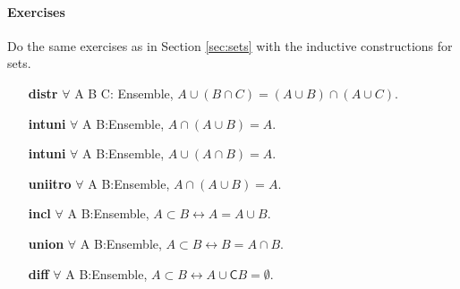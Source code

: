 \paragraph{\bf Exercises}
Do the same exercises as in Section \ref{sec:sets} with the inductive constructions for sets.
 \begin{enumerate}
  \item[\bf distr]$\forall$ A B C: Ensemble, $ A\cup(B \cap C) = (A \cup B) \cap (A \cup C).$

 \item[\bf intuni] $ \forall $ A B:Ensemble,  $ A\cap (A \cup B) =A.$
 
  \item[\bf intuni] $ \forall $ A B:Ensemble,  $ A\cup (A \cap B) =A.$

  \item[\bf uniitro] $ \forall $ A B:Ensemble,  $ A\cap (A \cup B) =A.$

 \item[\bf incl] $ \forall $ A B:Ensemble,  $ A\subset B  \leftrightarrow A= A \cup B.$
  \item[\bf union] $ \forall $ A B:Ensemble,  $ A\subset B  \leftrightarrow B= A \cap B.$
   \item[\bf diff] $ \forall $ A B:Ensemble,  $ A\subset B  \leftrightarrow A \cup \mathsf{C} B   =\emptyset.$



 \end{enumerate}
 
